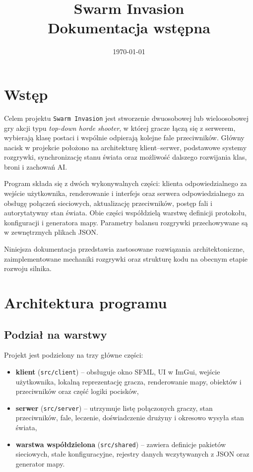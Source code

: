 \documentclass[a4paper,12pt]{article}
\title{Swarm Invasion\\Dokumentacja wstępna}
\author{}
\date{\today}
\begin{document}
\sloppy

\maketitle


\section{Wstęp}
Celem projektu \texttt{Swarm Invasion} jest stworzenie dwuosobowej lub wieloosobowej gry akcji typu \textit{top-down horde shooter}, w której gracze łączą się z serwerem, wybierają klasę postaci i wspólnie odpierają kolejne fale przeciwników. Główny nacisk w projekcie położono na architekturę klient--serwer, podstawowe systemy rozgrywki, synchronizację stanu świata oraz możliwość dalszego rozwijania klas, broni i zachowań AI.

Program składa się z dwóch wykonywalnych części: klienta odpowiedzialnego za wejście użytkownika, renderowanie i interfejs oraz serwera odpowiedzialnego za obsługę połączeń sieciowych, aktualizację przeciwników, postęp fali i autorytatywny stan świata. Obie części współdzielą warstwę definicji protokołu, konfiguracji i generatora mapy. Parametry balansu rozgrywki przechowywane są w zewnętrznych plikach JSON.

Niniejsza dokumentacja przedstawia zastosowane rozwiązania architektoniczne, zaimplementowane mechaniki rozgrywki oraz strukturę kodu na obecnym etapie rozwoju silnika.

\section{Architektura programu}
\subsection{Podział na warstwy}
Projekt jest podzielony na trzy główne części:
\begin{itemize}[leftmargin=1.5cm]
    \item \textbf{klient} (\texttt{src/client}) -- obsługuje okno SFML, UI w ImGui, wejście użytkownika, lokalną reprezentację gracza, renderowanie mapy, obiektów i przeciwników oraz część logiki pocisków,
    \item \textbf{serwer} (\texttt{src/server}) -- utrzymuje listę połączonych graczy, stan przeciwników, fale, leczenie, doświadczenie drużyny i okresowo wysyła stan świata,
    \item \textbf{warstwa współdzielona} (\texttt{src/shared}) -- zawiera definicje pakietów sieciowych, stałe konfiguracyjne, rejestry danych wczytywanych z JSON oraz generator mapy.
\end{itemize}
\end{document}
